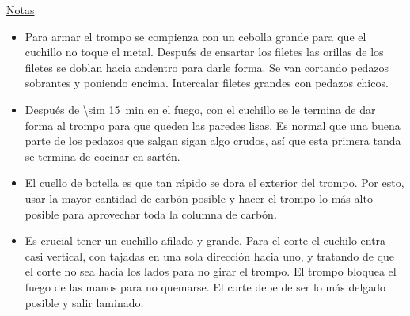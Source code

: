 \underline{Notas}
\begin{itemize}
\item Para armar el trompo se compienza con un cebolla grande para que el cuchillo no toque el metal. Después de ensartar los filetes las orillas de los filetes se doblan hacia andentro para darle forma. Se van cortando pedazos sobrantes y poniendo encima. Intercalar filetes grandes con pedazos chicos.
\item Después de \SI{\sim 15}{min} en el fuego, con el cuchillo se le termina de dar forma al trompo para que queden las paredes lisas. Es normal que una buena parte de los pedazos que salgan sigan algo crudos, así que esta primera tanda se termina de cocinar en sartén.
\item El cuello de botella es que tan rápido se dora el exterior del trompo. Por esto, usar la mayor cantidad de carbón posible y hacer el trompo lo más alto posible para aprovechar toda la columna de carbón.
\item Es crucial tener un cuchillo afilado y grande. Para el corte el cuchilo entra casi vertical, con tajadas en una sola dirección hacia uno, y tratando de que el corte no sea hacia los lados para no girar el trompo. El trompo bloquea el fuego de las manos para no quemarse. El corte debe de ser lo más delgado posible y salir laminado.
\end{itemize}
